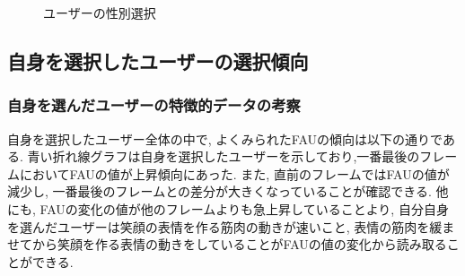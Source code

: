 \begin{figure}[htbp]
    \begin{center}
    \end{center}
    \caption{ユーザーの性別選択}
    \label{fig:choice_gender}
\end{figure}

\subsection{自身を選択したユーザーの選択傾向}

\subsubsection{自身を選んだユーザーの特徴的データの考察}
自身を選択したユーザー全体の中で, よくみられたFAUの傾向は以下の通りである.
青い折れ線グラフは自身を選択したユーザーを示しており,一番最後のフレームにおいてFAUの値が上昇傾向にあった.
また, 直前のフレームではFAUの値が減少し, 一番最後のフレームとの差分が大きくなっていることが確認できる.
他にも, FAUの変化の値が他のフレームよりも急上昇していることより, 自分自身を選んだユーザーは笑顔の表情を作る筋肉の動きが速いこと,
表情の筋肉を緩ませてから笑顔を作る表情の動きをしていることがFAUの値の変化から読み取ることができる.

